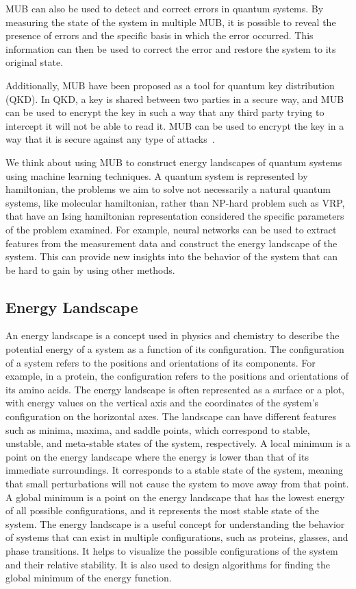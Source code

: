 MUB can also be used to detect and correct errors in quantum systems.
By measuring the state of the system in multiple MUB,
it is possible to reveal the presence of errors and the specific basis in which the error occurred.
This information can then be used to correct the error and restore the system to its original state.

Additionally, MUB have been proposed as a tool for quantum key distribution (QKD). In QKD,
a key is shared between two parties in a secure way, and MUB can be used to encrypt the key in such a way that any
third party trying to intercept it will not be able to read it.
MUB can be used to encrypt the key in a way that it is secure against any type of attacks~\cite{wootters1989optimal}.

We think about using MUB to construct energy landscapes of quantum systems using machine learning techniques.
A quantum system is represented by hamiltonian, the problems we aim to solve not necessarily a natural quantum systems,
like molecular hamiltonian, rather than NP-hard problem such as VRP, that have an Ising hamiltonian representation
considered the specific parameters of the problem examined.
For example, neural networks can be used to extract features from the measurement data and construct the
energy landscape of the system.
This can provide new insights into the behavior of the system that can be hard to gain by using other methods.


\subsection{Energy Landscape}\label{subsec:energy-landscape}
An energy landscape is a concept used in physics and chemistry to describe the potential energy of a system as a function of its configuration.
The configuration of a system refers to the positions and orientations of its components.
For example, in a protein, the configuration refers to the positions and orientations of its amino acids.
The energy landscape is often represented as a surface or a plot,
with energy values on the vertical axis and the coordinates of the system's configuration on the horizontal axes.
The landscape can have different features such as minima, maxima, and saddle points, which correspond to stable, unstable,
and meta-stable states of the system, respectively.
A local minimum is a point on the energy landscape where the energy is lower than that of its immediate surroundings.
It corresponds to a stable state of the system, meaning that small perturbations will not cause the system to move away from that point.
A global minimum is a point on the energy landscape that has the lowest energy of all possible configurations,
and it represents the most stable state of the system.
The energy landscape is a useful concept for understanding the behavior of systems that can exist in multiple configurations,
such as proteins, glasses, and phase transitions.
It helps to visualize the possible configurations of the system and their relative stability.
It is also used to design algorithms for finding the global minimum of the energy function.

